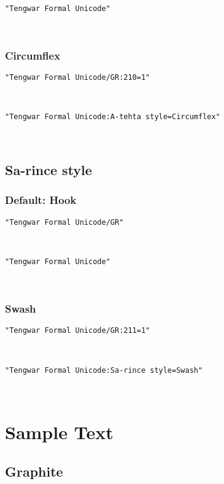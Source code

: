 \documentclass[11pt,a4paper]{article}
\begin{document}
\formalGR 

\noindent \texttt{"Tengwar Formal Unicode"}

\formalAAT 

\subsubsection{Circumflex}

\texttt{"Tengwar Formal Unicode/GR:210=1"}

\formalGRcircumflex 

\noindent \texttt{"Tengwar Formal Unicode:A-tehta style=Circumflex"}

\formalAATcircumflex 


\subsection{Sa-rince style}

\subsubsection{Default: Hook}

\texttt{"Tengwar Formal Unicode/GR"}

\formalGR 

\noindent \texttt{"Tengwar Formal Unicode"}

\formalAAT 

\subsubsection{Swash}

\texttt{"Tengwar Formal Unicode/GR:211=1"}

\formalGRswash 

\noindent \texttt{"Tengwar Formal Unicode:Sa-rince style=Swash"}

\formalAATswash 


\newpage

\section{Sample Text}

\subsection{Graphite}
\formalGR         
\end{document}
